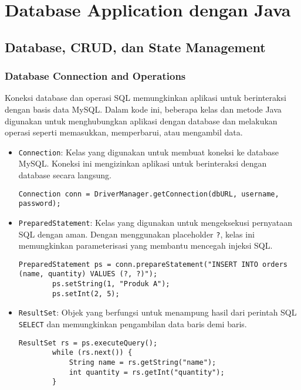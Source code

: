 \chapter{Database Application dengan Java}

\section{Database, CRUD, dan State Management}

\subsection{Database Connection and Operations}

Koneksi database dan operasi SQL memungkinkan aplikasi untuk berinteraksi dengan basis data MySQL. Dalam kode ini, beberapa kelas dan metode Java digunakan untuk menghubungkan aplikasi dengan database dan melakukan operasi seperti memasukkan, memperbarui, atau mengambil data.

\begin{itemize}
	\item \texttt{Connection}: Kelas yang digunakan untuk membuat koneksi ke database MySQL. Koneksi ini mengizinkan aplikasi untuk berinteraksi dengan database secara langsung.
	\begin{lstlisting}[style=JavaStyle]
		Connection conn = DriverManager.getConnection(dbURL, username, password);
	\end{lstlisting}
	
	\item \texttt{PreparedStatement}: Kelas yang digunakan untuk mengeksekusi pernyataan SQL dengan aman. Dengan menggunakan placeholder \texttt{?}, kelas ini memungkinkan parameterisasi yang membantu mencegah injeksi SQL.
	\begin{lstlisting}[style=JavaStyle]
		PreparedStatement ps = conn.prepareStatement("INSERT INTO orders (name, quantity) VALUES (?, ?)");
		ps.setString(1, "Produk A");
		ps.setInt(2, 5);
	\end{lstlisting}
	
	\item \texttt{ResultSet}: Objek yang berfungsi untuk menampung hasil dari perintah SQL \texttt{SELECT} dan memungkinkan pengambilan data baris demi baris.
	\begin{lstlisting}[style=JavaStyle]
		ResultSet rs = ps.executeQuery();
		while (rs.next()) {
			String name = rs.getString("name");
			int quantity = rs.getInt("quantity");
		}
	\end{lstlisting}
\end{itemize}

